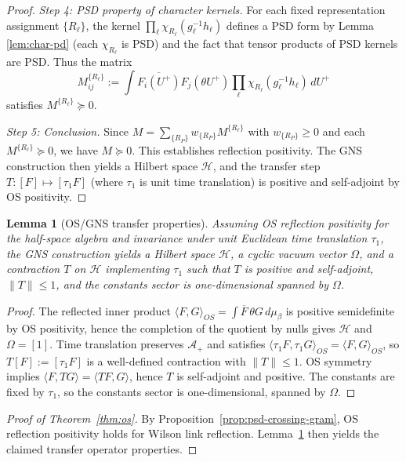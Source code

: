 \documentclass[11pt]{amsart}
\theoremstyle{plain}
\newtheorem{lemma}[theorem]{Lemma}
\theoremstyle{definition}
\theoremstyle{remark}
\begin{document}
\begin{proof}
\emph{Step 4: PSD property of character kernels.} For each fixed representation assignment $\{R_\ell\}$, the kernel $\prod_\ell \chi_{R_\ell}(g_\ell^{-1} h_\ell)$ defines a PSD form by Lemma \ref{lem:char-pd} (each $\chi_{R_\ell}$ is PSD) and the fact that tensor products of PSD kernels are PSD. Thus the matrix
\[
  M_{ij}^{\{R_\ell\}} := \int \overline{F_i(U^+)} F_j(\theta U^+) \prod_{\ell} \chi_{R_\ell}(g_\ell^{-1} h_\ell) \, dU^+
\]
satisfies $M^{\{R_\ell\}} \succeq 0$.

\emph{Step 5: Conclusion.} Since $M = \sum_{\{R_P\}} w_{\{R_P\}} M^{\{R_\ell\}}$ with $w_{\{R_P\}} \ge 0$ and each $M^{\{R_\ell\}} \succeq 0$, we have $M \succeq 0$. This establishes reflection positivity. The GNS construction then yields a Hilbert space $\mathcal H$, and the transfer step $T: [F] \mapsto [\tau_1 F]$ (where $\tau_1$ is unit time translation) is positive and self-adjoint by OS positivity.
\end{proof}

\begin{lemma}[OS/GNS transfer properties]\label{lem:os-gns-transfer}
Assuming OS reflection positivity for the half-space algebra and invariance under unit Euclidean time translation $\tau_1$, the GNS construction yields a Hilbert space $\mathcal H$, a cyclic vacuum vector $\Omega$, and a contraction $T$ on $\mathcal H$ implementing $\tau_1$ such that $T$ is positive and self-adjoint, $\|T\|\le 1$, and the constants sector is one-dimensional spanned by $\Omega$.
\end{lemma}
\begin{proof}
The reflected inner product $\langle F,G\rangle_{OS}=\int \overline{F}\,\theta G\,d\mu_\beta$ is positive semidefinite by OS positivity, hence the completion of the quotient by nulls gives $\mathcal H$ and $\Omega=[1]$. Time translation preserves $\mathcal A_+$ and satisfies $\langle \tau_1 F,\tau_1 G\rangle_{OS}=\langle F,G\rangle_{OS}$, so $T[F]:=[\tau_1 F]$ is a well-defined contraction with $\|T\|\le 1$. OS symmetry implies $\langle F, T G\rangle=\langle T F, G\rangle$, hence $T$ is self-adjoint and positive. The constants are fixed by $\tau_1$, so the constants sector is one-dimensional, spanned by $\Omega$.
\end{proof}

\begin{proof}[Proof of Theorem~\ref{thm:os}]
By Proposition~\ref{prop:psd-crossing-gram}, OS reflection positivity holds for Wilson link reflection. Lemma~\ref{lem:os-gns-transfer} then yields the claimed transfer operator properties.
\end{proof}
\end{document}
